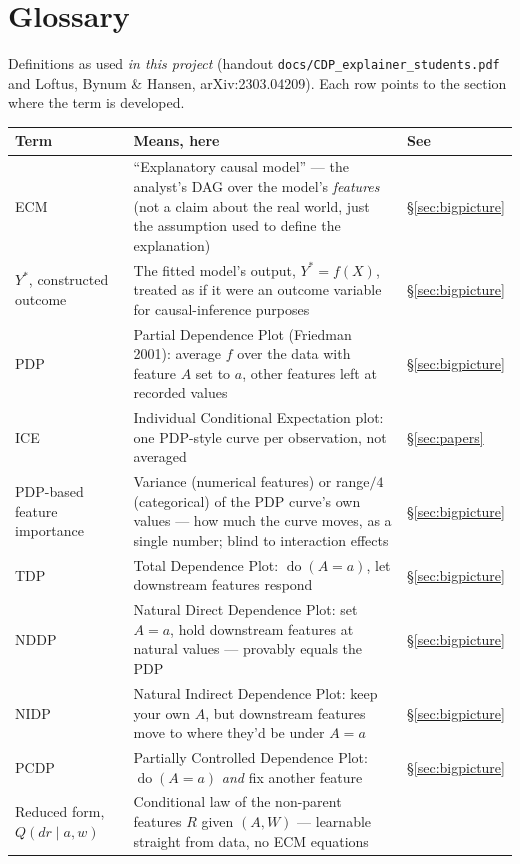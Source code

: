 \section{Glossary}
\label{sec:glossary}

Definitions as used \emph{in this project} (handout
\texttt{docs/CDP\_explainer\_students.pdf} and Loftus, Bynum \& Hansen,
arXiv:2303.04209). Each row points to the section where the term is
developed.

\begin{longtable}{@{}p{3.1cm}p{7.4cm}p{2.4cm}@{}}
\toprule
\textbf{Term} & \textbf{Means, here} & \textbf{See} \\
\midrule
\endhead
ECM & ``Explanatory causal model'' --- the analyst's DAG over the model's
  \emph{features} (not a claim about the real world, just the assumption
  used to define the explanation) & \S\ref{sec:bigpicture} \\
$Y^*$, constructed outcome & The fitted model's output, $Y^*=f(X)$, treated
  as if it were an outcome variable for causal-inference purposes &
  \S\ref{sec:bigpicture} \\
PDP & Partial Dependence Plot (Friedman 2001): average $f$ over the data
  with feature $A$ set to $a$, other features left at recorded values &
  \S\ref{sec:bigpicture} \\
ICE & Individual Conditional Expectation plot: one PDP-style curve per
  observation, not averaged & \S\ref{sec:papers} \\
PDP-based feature importance & Variance (numerical features) or range$/4$
  (categorical) of the PDP curve's own values --- how much the curve moves,
  as a single number; blind to interaction effects & \S\ref{sec:bigpicture} \\
TDP & Total Dependence Plot: $\operatorname{do}(A=a)$, let downstream
  features respond & \S\ref{sec:bigpicture} \\
NDDP & Natural Direct Dependence Plot: set $A=a$, hold downstream features
  at natural values --- provably equals the PDP & \S\ref{sec:bigpicture} \\
NIDP & Natural Indirect Dependence Plot: keep your own $A$, but downstream
  features move to where they'd be under $A=a$ & \S\ref{sec:bigpicture} \\
PCDP & Partially Controlled Dependence Plot: $\operatorname{do}(A=a)$
  \emph{and} fix another feature & \S\ref{sec:bigpicture} \\
Reduced form, $Q(dr\mid a,w)$ & Conditional law of the non-parent features
  $R$ given $(A,W)$ --- learnable straight from data, no ECM equations

\end{longtable}
